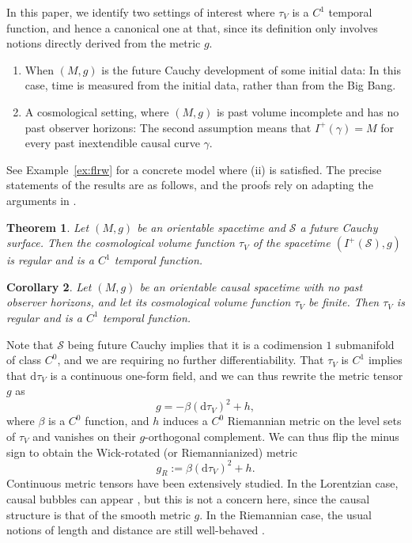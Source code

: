 \documentclass[a4paper,11pt]{amsart}
\newtheorem{theorem}{{Theorem}}[section]
\newtheorem{corollary}[theorem]{{Corollary}}%
\newcommand{\dd}{\mathrm{d}}
\newcommand{\CS}{\mathcal{S}}
\newcommand{\df}{\mathrm{d}}
\begin{document}
In this paper, we identify two settings of interest where $\tau_V$ is a $C^1$ temporal function, and hence a canonical one at that, since its definition only involves notions directly derived from the metric $g$.
\begin{enumerate}
    \item When $(M,g)$ is the future Cauchy development of some initial data: In this case, time is measured from the initial data, rather than from the Big Bang.
    \item A cosmological setting, where $(M,g)$ is past volume incomplete and has no past observer horizons: The second assumption means that $I^+(\gamma) = M$ for every past inextendible causal curve $\gamma$.
\end{enumerate}
See Example~\ref{ex:flrw} for a concrete model where (ii) is satisfied. The precise statements of the results are as follows, and the proofs rely on adapting the arguments in \cite{CGM16}.

\begin{theorem} \label{thm:main}
    Let $(M,g)$ be an orientable spacetime and $\CS$ a future Cauchy surface. Then the cosmological volume function $\tau_V$ of the spacetime $(I^+(\CS),g)$ is regular and is a $C^1$ temporal function.
\end{theorem}

\begin{corollary} \label{cor:main}
 Let $(M,g)$ be an orientable causal spacetime with no past observer horizons, and let its cosmological volume function $\tau_V$ be finite. Then $\tau_V$ is regular and is a $C^1$ temporal function.
\end{corollary}

Note that $\CS$ being future Cauchy implies that it is a codimension $1$ submanifold of class $C^0$, and we are requiring no further differentiability. That $\tau_V$ is $C^1$ implies that $\df \tau_V$ is a continuous one-form field, and we can thus rewrite the metric tensor $g$ as
\begin{equation*}
    g = -\beta (\dd \tau_V)^2 + h,
\end{equation*}
where $\beta$ is a $C^0$ function, and $h$ induces a $C^0$ Riemannian metric on the level sets of $\tau_V$ and vanishes on their $g$-orthogonal complement. We can thus flip the minus sign to obtain the Wick-rotated (or Riemannianized) metric
\begin{equation*}
    g_R := \beta (\dd \tau_V)^2 + h.
\end{equation*}
Continuous metric tensors have been extensively studied. In the Lorentzian case, causal bubbles can appear \cite{ChGr12}, but this is not a concern here, since the causal structure is that of the smooth metric $g$. In the Riemannian case, the usual notions of length and distance are still well-behaved \cite{Bur15}.
\end{document}
